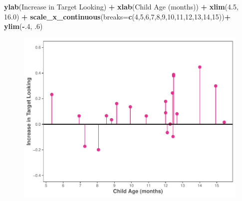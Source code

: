 \documentclass[
  doc,floatsintext]{apa6}
\newenvironment{Shaded}{\begin{snugshade}}{\end{snugshade}}
\newcommand{\AttributeTok}[1]{\textcolor[rgb]{0.13,0.29,0.53}{#1}}
\newcommand{\DecValTok}[1]{\textcolor[rgb]{0.00,0.00,0.81}{#1}}
\newcommand{\FloatTok}[1]{\textcolor[rgb]{0.00,0.00,0.81}{#1}}
\newcommand{\FunctionTok}[1]{\textcolor[rgb]{0.13,0.29,0.53}{\textbf{#1}}}
\newcommand{\NormalTok}[1]{#1}
\newcommand{\SpecialCharTok}[1]{\textcolor[rgb]{0.81,0.36,0.00}{\textbf{#1}}}
\newcommand{\StringTok}[1]{\textcolor[rgb]{0.31,0.60,0.02}{#1}}
\begin{document}
\begin{Shaded}
\begin{Highlighting}[]
  \FunctionTok{ylab}\NormalTok{(}\StringTok{\textquotesingle{}Increase in Target Looking\textquotesingle{}}\NormalTok{) }\SpecialCharTok{+}
  \FunctionTok{xlab}\NormalTok{(}\StringTok{\textquotesingle{}Child Age (months)\textquotesingle{}}\NormalTok{) }\SpecialCharTok{+}
  \FunctionTok{xlim}\NormalTok{(}\FloatTok{4.5}\NormalTok{, }\FloatTok{16.0}\NormalTok{) }\SpecialCharTok{+}
  \FunctionTok{scale\_x\_continuous}\NormalTok{(}\AttributeTok{breaks=}\FunctionTok{c}\NormalTok{(}\DecValTok{4}\NormalTok{,}\DecValTok{5}\NormalTok{,}\DecValTok{6}\NormalTok{,}\DecValTok{7}\NormalTok{,}\DecValTok{8}\NormalTok{,}\DecValTok{9}\NormalTok{,}\DecValTok{10}\NormalTok{,}\DecValTok{11}\NormalTok{,}\DecValTok{12}\NormalTok{,}\DecValTok{13}\NormalTok{,}\DecValTok{14}\NormalTok{,}\DecValTok{15}\NormalTok{))}\SpecialCharTok{+}
  \FunctionTok{ylim}\NormalTok{(}\SpecialCharTok{{-}}\NormalTok{.}\DecValTok{4}\NormalTok{, .}\DecValTok{6}\NormalTok{) }
\end{Highlighting}
\end{Shaded}

\begin{figure}

{\centering \includegraphics{revised_ms_analyses_files/figure-latex/r2-cn-by-subject-plot-incl-1} 

}

\caption{ }\label{fig:r2-cn-by-subject-plot-incl}
\end{figure}
\end{document}

